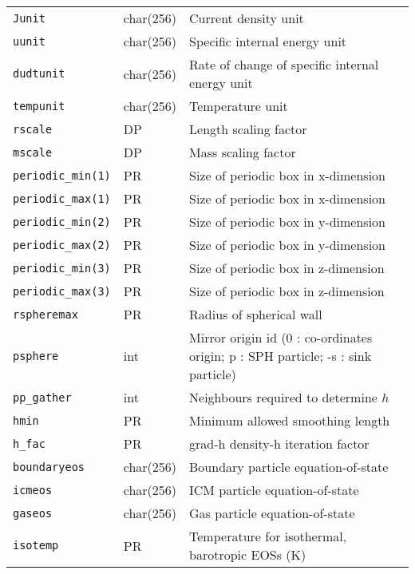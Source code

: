 \documentclass[a4paper]{article}
\newcommand{\var}[1]{\texttt{#1}}
\begin{document}
\begin{center}
\begin{supertabular}{|p{3cm}|p{2cm}|p{8cm}|}
\var{Junit}      & char(256) & Current density unit \\
\var{uunit}      & char(256) & Specific internal energy unit \\
\var{dudtunit}   & char(256) & Rate of change of specific internal energy unit \\
\var{tempunit}   & char(256) & Temperature unit \\
\var{rscale}     & DP        & Length scaling factor \\
\var{mscale}     & DP        & Mass scaling factor \\ \hline
\var{periodic\_min(1)} & PR & Size of periodic box in x-dimension \\
\var{periodic\_max(1)} & PR & Size of periodic box in x-dimension \\
\var{periodic\_min(2)} & PR & Size of periodic box in y-dimension \\
\var{periodic\_max(2)} & PR & Size of periodic box in y-dimension \\
\var{periodic\_min(3)} & PR & Size of periodic box in z-dimension \\
\var{periodic\_max(3)} & PR & Size of periodic box in z-dimension \\ 
\var{rspheremax}       & PR & Radius of spherical wall \\ 
\var{psphere}    & int      & Mirror origin id (0 : co-ordinates origin; p : SPH particle; -s : sink particle) \\ \hline
%
\var{pp\_gather} & int      & Neighbours required to determine $h$ \\
\var{hmin}       & PR       & Minimum allowed smoothing length \\
\var{h\_fac}     & PR       & grad-h density-h iteration factor \\ \hline
\var{boundaryeos}& char(256)& Boundary particle equation-of-state \\
\var{icmeos}     & char(256)& ICM particle equation-of-state \\
\var{gaseos}     & char(256)& Gas particle equation-of-state \\
\var{isotemp}    & PR       & Temperature for isothermal, barotropic EOSs (K) \\

\end{supertabular}
\end{center}
\end{document}
